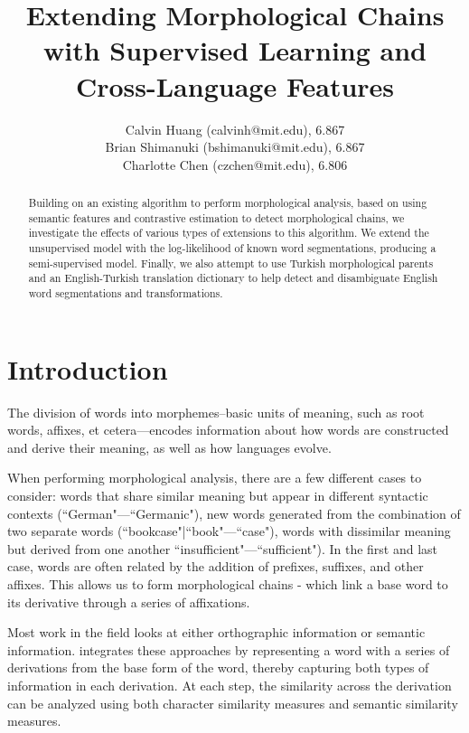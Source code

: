 \documentclass[11pt,twocolumn]{article}
\begin{document}
 
\title{Extending Morphological Chains with Supervised Learning and Cross-Language Features}

\author{Calvin Huang (calvinh@mit.edu), 6.867\\
    Brian Shimanuki (bshimanuki@mit.edu), 6.867\\
    Charlotte Chen (czchen@mit.edu), 6.806\\
}

\maketitle
\thispagestyle{empty}

\begin{abstract}
    Building on an existing algorithm to perform morphological analysis,
    based on using semantic features and contrastive estimation to detect morphological chains,
    we investigate the effects of various types of extensions to this algorithm.
    We extend the unsupervised model with the log-likelihood of known word segmentations,
    producing a semi-supervised model.
    Finally, we also attempt to use Turkish morphological parents and an English-Turkish translation
    dictionary to help detect and disambiguate English word segmentations and transformations.
\end{abstract}

\section{Introduction}
The division of words into morphemes--basic units of meaning, such as root words,
affixes, et cetera---encodes information about how words are constructed and derive their meaning,
as well as how languages evolve.

When performing morphological analysis, there are a few different cases to consider: words that share similar
meaning but appear in different syntactic contexts (``German"---``Germanic"), new words generated from
the combination of two separate words (``bookcase"|``book"---``case"), words with dissimilar meaning but
derived from one another ``insufficient"---``sufficient"). In the first and last case, words are often related
by the addition of prefixes, suffixes, and other affixes. This allows us to form morphological chains - which
link a base word to its derivative through a series of affixations.

Most work in the field looks at either orthographic information or
semantic information. \citet{Narasimhan15} integrates these approaches by representing a word
with a series of derivations from the base form of the word, thereby capturing both types of information in each derivation.
At each step, the similarity across the derivation can be analyzed using both character similarity measures and semantic similarity measures.
\end{document}
